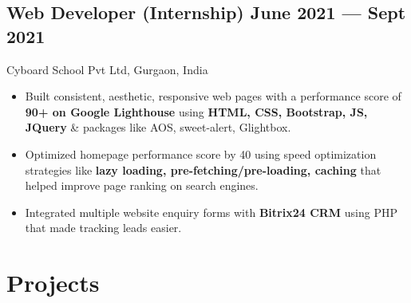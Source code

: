 \documentclass[a4,10pt]{article}
\newcommand{\subtext}[1]{
#1\par\vspace{-0.2cm}}
\newenvironment{zitemize}{
\begin{itemize}\itemsep0pt \parskip0pt \parsep1pt}
{\end{itemize}\vspace{-0.5cm}}
\begin{document}
\subsection*{Web Developer {\normalsize\normalfont (Internship)} \hfill June 2021 --- Sept 2021} 
\subtext{Cyboard School Pvt Ltd, Gurgaon, India} 
    \begin{zitemize}
        \item Built consistent, aesthetic, responsive web pages with a performance score of \textbf{90+ on Google Lighthouse}
        using \textbf{HTML, CSS, Bootstrap, JS, JQuery} \& packages like AOS, sweet-alert, Glightbox. 
        \item Optimized homepage performance score by 40 using speed optimization strategies like \textbf{lazy loading, pre-fetching/pre-loading, caching} that helped improve page ranking on search engines.
        \item Integrated multiple website enquiry forms with \textbf{Bitrix24 CRM} using PHP that made tracking leads easier.
    \end{zitemize}





\section{Projects} %



\end{document}
